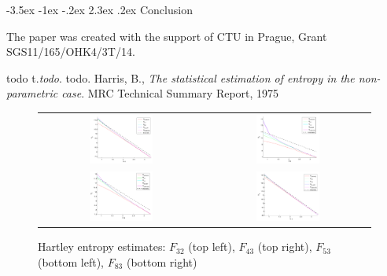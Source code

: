 \documentclass[a4paper,10pt]{article}
\makeatletter
\renewcommand\section{\@startsection {section}{1}{\z@}%
                                   {-3.5ex \@plus -1ex \@minus -.2ex}%
                                   {2.3ex \@plus.2ex}%
                                   {\large\bfseries}}
\makeatother
\begin{document}
\section {Conclusion }


\vspace*{10pt}  The paper was created with the support of CTU in Prague, Grant SGS11/165/OHK4/3T/14.

\begin{thebibliography}{99}
\vskip12pt
\label{bib1} todo t.\textit{todo}. todo.
\label{bib5} Harris, B., \textit{The statistical estimation of entropy in the non-parametric case}. MRC Technical Summary Report, 1975 


\begin{figure}[H]
\centering
\begin{tabular}{cc}
\includegraphics[width=0.4\textwidth]{images5/frac32i.pdf} &
\includegraphics[width=0.4\textwidth]{images5/frac43i.pdf} \\
\includegraphics[width=0.4\textwidth]{images5/frac53i.pdf} &
\includegraphics[width=0.4\textwidth]{images5/frac83i.pdf}
\end{tabular}
\caption{Hartley entropy estimates: $F_{32}$ (top left), $F_{43}$ (top right), $F_{53}$ (bottom left), $F_{83}$ (bottom right) }
\label{fig:frac}
\end{figure}



\end{thebibliography}
\end{document}
